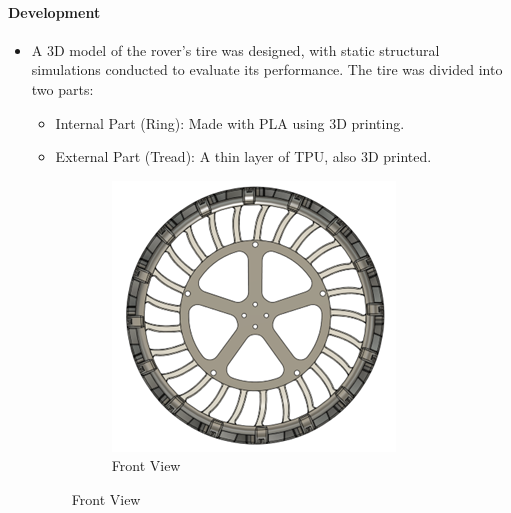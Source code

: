 \documentclass{article}
\begin{document}
\paragraph[short]{Development}
\begin{itemize}
    \item A 3D model of the rover's tire was designed, with static structural simulations conducted to evaluate its performance.
    The tire was divided into two parts:
    \begin{itemize}
        \item Internal Part (Ring): Made with PLA using 3D printing.
        \item External Part (Tread): A thin layer of TPU, also 3D printed.
    \end{itemize}
    
    \begin{figure}[H]
        \centering
        \begin{subfigure}{.5\textwidth}
          \centering
          \includegraphics[width=.9\linewidth]{Images/Wheels/FrontViewP2.png}
          \caption{Front View}
          

\end{subfigure}
\end{figure}
\end{itemize}
\end{document}
